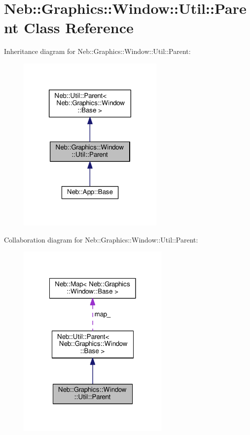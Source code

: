 \hypertarget{classNeb_1_1Graphics_1_1Window_1_1Util_1_1Parent}{\section{Neb\-:\-:Graphics\-:\-:Window\-:\-:Util\-:\-:Parent Class Reference}
\label{classNeb_1_1Graphics_1_1Window_1_1Util_1_1Parent}
}


Inheritance diagram for Neb\-:\-:Graphics\-:\-:Window\-:\-:Util\-:\-:Parent\-:
\nopagebreak
\begin{figure}[H]
\begin{center}
\leavevmode
\includegraphics[width=202pt]{classNeb_1_1Graphics_1_1Window_1_1Util_1_1Parent__inherit__graph}
\end{center}
\end{figure}


Collaboration diagram for Neb\-:\-:Graphics\-:\-:Window\-:\-:Util\-:\-:Parent\-:
\nopagebreak
\begin{figure}[H]
\begin{center}
\leavevmode
\includegraphics[width=210pt]{classNeb_1_1Graphics_1_1Window_1_1Util_1_1Parent__coll__graph}
\end{center}
\end{figure}
